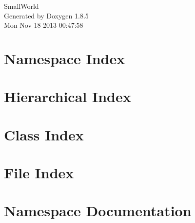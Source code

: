 \documentclass[twoside]{book}
\newcommand{\clearemptydoublepage}{%
  \newpage{\pagestyle{empty}\cleardoublepage}%
}
\begin{document}
\hypersetup{pageanchor=false}
\begin{titlepage}
\vspace*{7cm}
\begin{center}%
{\Large Small\-World }\\
\vspace*{1cm}
{\large Generated by Doxygen 1.8.5}\\
\vspace*{0.5cm}
{\small Mon Nov 18 2013 00:47:58}\\
\end{center}
\end{titlepage}
\clearemptydoublepage
\tableofcontents
\clearemptydoublepage
{}
\hypersetup{pageanchor=true}

\chapter{Namespace Index}

\chapter{Hierarchical Index}

\chapter{Class Index}

\chapter{File Index}

\chapter{Namespace Documentation}


\end{document}
